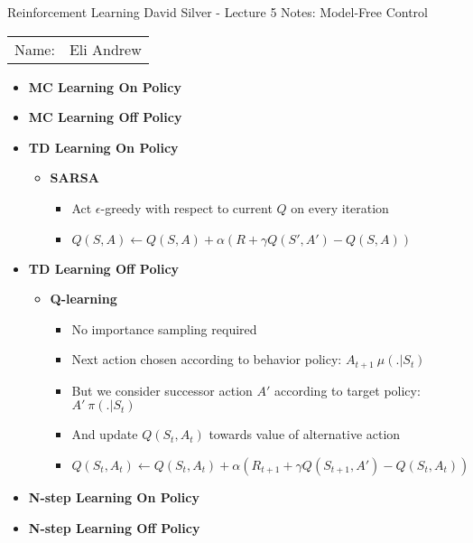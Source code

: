 \documentclass[12pt]{article}
\begin{document}
\begin{center}
{\Large Reinforcement Learning David Silver - Lecture 5 Notes: Model-Free Control}

\begin{tabular}{rl}
Name: & Eli Andrew
\end{tabular}
\end{center}

  \begin{itemize}
    \item \textbf{MC Learning On Policy}
    \item \textbf{MC Learning Off Policy}
    \item \textbf{TD Learning On Policy}
      \begin{itemize}
        \item \textbf{SARSA}
        \begin{itemize}
          \item Act $\epsilon$-greedy with respect to current $Q$ on every iteration
          \item $Q(S, A) \leftarrow Q(S, A) + \alpha(R + \gamma Q(S', A') - Q(S, A))$
        \end{itemize}
      \end{itemize}
    \item \textbf{TD Learning Off Policy}
    \begin{itemize}
      \item \textbf{Q-learning}
      \begin{itemize}
        \item No importance sampling required
        \item Next action chosen according to behavior policy: $A_{t+1} ~ \mu(. | S_t)$
        \item But we consider successor action $A'$ according to target policy: $A' ~ \pi(. | S_t)$
        \item And update $Q(S_t, A_t)$ towards value of alternative action
        \item $Q(S_t, A_t) \leftarrow Q(S_t, A_t) + \alpha(R_{t+1} + \gamma Q(S_{t+1}, A') - Q(S_t, A_t))$
      \end{itemize}
    \end{itemize}
    \item \textbf{N-step Learning On Policy}
    \item \textbf{N-step Learning Off Policy}
  \end{itemize} 
\end{document}
